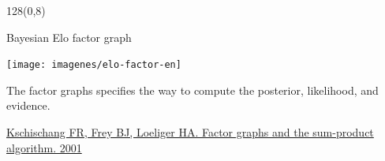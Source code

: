 \documentclass[shownotes]{beamer}
\begin{document}
\begin{frame}
 \begin{textblock}{128}(0,8)
\begin{center}
 \normalsize Bayesian Elo factor graph
\end{center}
\end{textblock}
\vspace{0.6cm}

\centering
\texttt{[image: imagenes/elo-factor-en]}   

\pause
\vspace{0.3cm}

\tiny
The factor graphs specifies the way to compute the posterior, likelihood, and evidence.

\href{https://ieeexplore.ieee.org/stamp/stamp.jsp?arnumber=910572}{Kschischang FR, Frey BJ, Loeliger HA. Factor graphs and the sum-product algorithm. 2001}

\end{frame}
\end{document}
